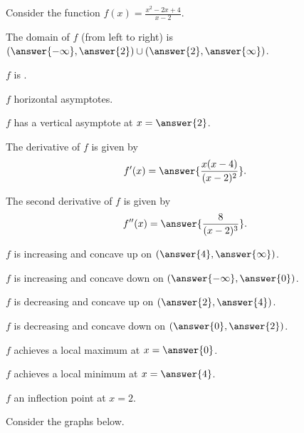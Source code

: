 \documentclass{ximera}
\author{Nela Lakos \and Kyle Parsons}
\begin{document}
\begin{exercise}

Consider the function $f(x) = \frac{x^2-2x+4}{x-2}$.

The domain of $f$ (from left to right) is $\left(\answer{-\infty},\answer{2}\right)\cup\left(\answer{2},\answer{\infty}\right)$.

$f$ is .

$f$  horizontal asymptotes.

$f$ has a vertical asymptote at $x=\answer{2}$.

The derivative of $f$ is given by
\[
f'(x) = \answer{\frac{x(x-4)}{(x-2)^2}}.
\]

The second derivative of $f$ is given by
\[
f''(x) = \answer{\frac{8}{(x-2)^3}}.
\]

$f$ is increasing and concave up on $\left(\answer{4},\answer{\infty}\right)$.

$f$ is increasing and concave down on $\left(\answer{-\infty},\answer{0}\right)$.

$f$ is decreasing and concave up on $\left(\answer{2},\answer{4}\right)$.

$f$ is decreasing and concave down on $\left(\answer{0},\answer{2}\right)$.

$f$ achieves a local maximum at $x=\answer{0}$.

$f$ achieves a local minimum at $x=\answer{4}$.

$f$  an inflection point at $x=2$.

Consider the graphs below.

\end{exercise}
\end{document}
